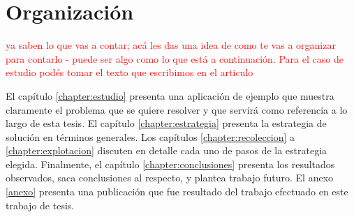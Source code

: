\section{Organización}
\label{section:organizacion}

\begin{framed}
\textcolor{red}{ya saben lo que vas a contar; acá les das una idea de como te vas a organizar para contarlo - puede ser algo como lo que está a continuación. Para el caso de estudio podés tomar el texto que escribimos en el articulo}
\end{framed}

El capítulo \ref{chapter:estudio} presenta una aplicación de ejemplo que muestra claramente el problema que se quiere resolver y que servirá como referencia a lo largo de esta tesis. El capítulo \ref{chapter:estrategia} presenta la estrategia de solución en términos generales. Los capítulos \ref{chapter:recoleccion} a \ref{chapter:explotacion} discuten en detalle cada uno de pasos de la estrategia elegida. Finalmente, el capítulo \ref{chapter:conclusiones} presenta los resultados observados, saca conclusiones al respecto, y plantea trabajo futuro. El anexo \ref{anexo} presenta una publicación que fue resultado del trabajo efectuado en este trabajo de tesis. 




